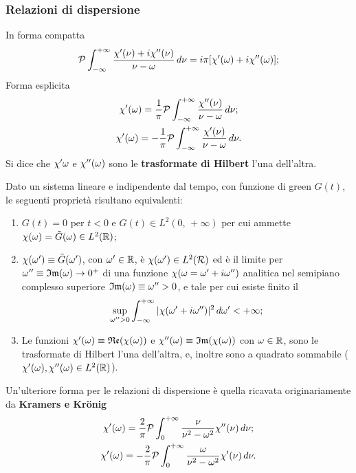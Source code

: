 \subsubsection*{Relazioni di dispersione}
In forma compatta
\[
    \mathcal{P}\int_{-\infty}^{+\infty}\frac{\chi'(\nu)+i\chi''(\nu)}{\nu-\omega}\,d\nu=i\pi[\chi'(\omega)+i\chi''(\omega)];
\]
Forma esplicita
\begin{gather*}
    \chi'(\omega) = \frac{1}{\pi}\mathcal{P}\int_{-\infty}^{+\infty}\frac{\chi''(\nu)}{\nu-\omega}\,d\nu;\\
    \chi'(\omega) = -\frac{1}{\pi}\mathcal{P}\int_{-\infty}^{+\infty}\frac{\chi'(\nu)}{\nu-\omega}\,d\nu.
\end{gather*}
Si dice che $\chi'{\omega}$ e $\chi''(\omega)$ sono le \textbf{trasformate di Hilbert} l'una dell'altra.
\begin{theorem}[di Titchmarsch]
    Dato un sistema lineare e indipendente dal tempo, con funzione di green $G(t)$, le seguenti proprietà risultano equivalenti:
    \begin{enumerate}[label=(\roman*)]
        \item $G(t)=0$ per $t<0$ e $G(t)\in L^2(0,\,+\infty)$ per cui ammette $\chi(\omega)=\Tilde{G}(\omega)\in L^2(\mathbb{R})$;
        \item $\chi(\omega')\equiv\Tilde{G}(\omega') $, con $\omega'\in\mathbb{R}$, è $\chi(\omega')\in L^2(\mathcal{R})$ ed è il limite per $\omega''\equiv\mathfrak{Im}(\omega)\to0^+$ di una funzione $\chi(\omega=\omega'+i\omega'')$ analitica nel semipiano complesso superiore $\mathfrak{Im}(\omega)\equiv\omega''>0$, e tale per cui esiste finito il
        \[
            \sup_{\omega''>0}\int_{-\infty}^{+\infty}|\chi(\omega'+i\omega'')|^2\,d\omega'<+\infty;
        \]
        \item Le funzioni $\chi'(\omega)\equiv\mathfrak{Re}(\chi(\omega))$ e $\chi''(\omega)\equiv\mathfrak{Im}(\chi(\omega))$ con $\omega\in\mathbb{R}$, sono le trasformate di Hilbert l'una dell'altra, e, inoltre sono a quadrato sommabile ($\chi'(\omega), \chi''(\omega)\in L^2(\mathbb{R})$).
    \end{enumerate}
\end{theorem}
Un'ulteriore forma per le relazioni di dispersione è quella ricavata originariamente da \textbf{Kramers e Krönig}
\begin{gather*}
    \chi'(\omega) = \frac{2}{\pi}\mathcal{P}\int_{0}^{+\infty}\frac{\nu}{\nu^2-\omega^2}\chi''(\nu)\,d\nu;\\
    \chi'(\omega) = -\frac{2}{\pi}\mathcal{P}\int_{0}^{+\infty}\frac{\omega}{\nu^2-\omega^2}\chi'(\nu)\,d\nu.
\end{gather*}